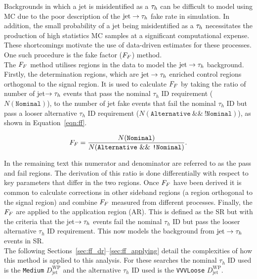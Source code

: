 Backgrounds in which a jet is misidentified as a $\tau_{h}$ can be difficult to model using MC due to the poor description of the $\text{jet}\rightarrow\tau_{h}$ fake rate in simulation. 
In addition, the small probability of a jet being misidentified as a $\tau_{h}$ necessitates the production of high statistics MC samples at a significant computational expense.
These shortcomings motivate the use of data-driven estimates for these processes. 
One such procedure is the fake factor ($F_{F}$) method. \\

The $F_{F}$ method utilises regions in the data to model the $\text{jet}\rightarrow\tau_{h}$ background. 
Firstly, the determination regions, which are $\text{jet}\rightarrow\tau_{h}$ enriched control regions orthogonal to the signal region. 
It is used to calculate $F_{F}$ by taking the ratio of number of jet$\rightarrow\tau_{h}$ events that pass the nominal $\tau_h$ ID requirement ($N(\texttt{Nominal})$), to the number of jet fake events that fail the nominal $\tau_h$ ID but pass a looser alternative $\tau_h$ ID requirement ($N(\texttt{Alternative}~\&\&~\texttt{!Nominal})$), as shown in Equation~\ref{eqn:ff}.

\begin{equation}
F_{F} = \frac{N(\texttt{Nominal})}{N(\texttt{Alternative}~\&\&~\texttt{!Nominal})}.
\label{eqn:ff}
\end{equation}

In the remaining text this numerator and denominator are referred to as the pass and fail regions.
The derivation of this ratio is done differentially with respect to key parameters that differ in the two regions.
Once $F_{F}$ have been derived it is common to calculate corrections in other sideband regions (a region orthogonal to the signal region) and combine $F_{F}$ measured from different processes.
Finally, the $F_{F}$ are applied to the application region (AR). 
This is defined as the SR but with the criteria that the jet$\rightarrow\tau_{h}$ events fail the nominal $\tau_h$ ID but pass the looser alternative $\tau_h$ ID requirement.
This now models the background from $\text{jet}\rightarrow\tau_{h}$ events in SR. \\

The following Sections~\ref{sec:ff_dr}--\ref{sec:ff_applying} detail the complexities of how this method is applied to this analysis.
For these searches the nominal $\tau_h$ ID used is the \texttt{Medium} $D_{\text{jet}}^{\text{WP}}$ and the alternative $\tau_h$ ID used is the \texttt{VVVLoose} $D_{\text{jet}}^{\text{WP}}$.

